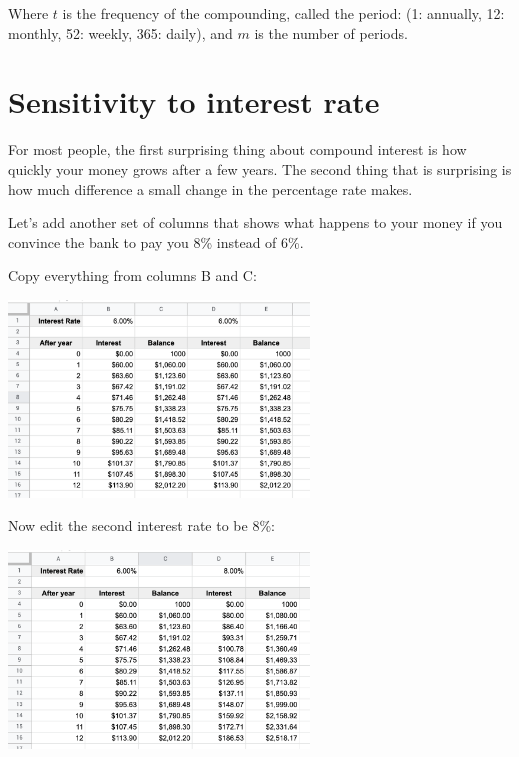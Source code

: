 Where $t$ is the frequency of the compounding, called the period: (1: annually, 12: monthly, 52: weekly, 365: daily), and $m$ is the number of periods.

\section{Sensitivity to interest rate}

For most people, the first surprising thing about compound interest is
how quickly your money grows after a few years.  The second thing that
is surprising is how much difference a small change in the percentage
rate makes.

Let's add another set of columns that shows what happens to your money
if you convince the bank to pay you 8\% instead of 6\%.

Copy everything from columns B and C:

\includegraphics[width=0.6\textwidth]{CopyForSecondInterest.png}

Now edit the second interest rate to be 8\%:

\includegraphics[width=0.6\textwidth]{AtBiggerInterestRate.png}


